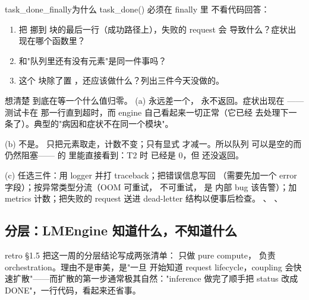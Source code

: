 \begin{checkpoint}{task_done_finally}{为什么 task\_done() 必须在 finally 里}
不看代码回答：
\begin{enumerate}[label=(\alph*)]
  \item 把  挪到  块的最后一行（成功路径上），失败的 request 会
        导致什么？症状出现在哪个函数里？
  \item {} 和"队列里还有没有元素"是同一件事吗？
  \item 这个  块除了置 ，还应该做什么？列出三件今天没做的。
\end{enumerate}
\hint 想清楚  到底在等一个什么值归零。
\ifshowanswers
\tcblower
\answer (a)  永远差一个， 永不返回。症状出现在
——测试卡在  那一行直到超时，而 engine 自己看起来一切正常（它已经
去处理下一条了）。典型的"病因和症状不在同一个模块"。

(b) 不是。 只把元素取走，计数不变；只有显式  才减一。所以队列
可以是空的而  仍然阻塞—— 的 
里能直接看到：T2 时  已经是 0，但  还没返回。

(c) 任选三件：用 logger 并打 traceback；把错误信息写回 （需要先加一个 error
字段）；按异常类型分流（OOM 可重试， 不可重试， 是
内部 bug 该告警）；加 metrics 计数；把失败的 request 送进 dead-letter 结构以便事后检查。
\whereincode {}、
、
\fi
\end{checkpoint}

\subsection{分层：LMEngine 知道什么，不知道什么}
\label{sec:a-loop-layering}

retro §1.5 把这一周的分层结论写成两张清单： 只做 pure compute，
 负责 orchestration。理由不是审美，是"一旦  开始知道
request lifecycle，coupling 会快速扩散"——而扩散的第一步通常极其自然："inference 做完了顺手把
status 改成 DONE"，一行代码，看起来还省事。

